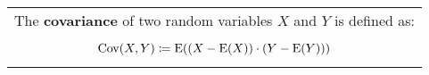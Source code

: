{\tabulinesep=1mm
\begin{tabu}{|p{16cm} |}
\hline
The \textbf{covariance} of two random variables $X$ and $Y$ is defined as: \\
\[\text{Cov}(X, Y) \coloneqq \text{E} ((X - \text{E}(X)) \cdot (Y - \text{E}(Y)))\] \\
\hline
\end{tabu}
}